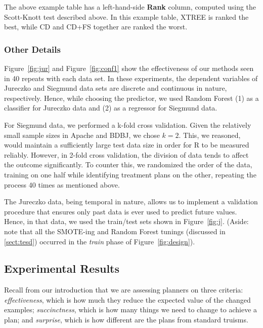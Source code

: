 \documentclass{sig-alternate}
\newcommand{\tion}[1]{\textsection\ref{sect:#1}}
\newcommand{\fig}[1]{Figure~\ref{fig:#1}}
\begin{document}
The above example table has a  left-hand-side  {\bf Rank} column, computed using the
Scott-Knott test described above. In this example table, XTREE is ranked the best, while CD and CD+FS together are ranked the worst.
  
   
 

 
\subsubsection{Other Details}
 
\fig{jur} and \fig{conf1} show the effectiveness of our methods seen in 40 repeats with each data set.
In these experiments,   the dependent variables of Jureczko and Siegmund data sets are discrete and continuous in nature, respectively. Hence, while choosing the predictor, we used Random Forest (1) as a classifier for Jureczko data and (2) as a regressor for Siegmund data.

For Siegmund data, we performed a k-fold cross validation. Given the relatively small sample sizes in Apache and BDBJ, we chose $k=2$. This, we reasoned, would maintain a sufficiently large test data size in order for R to be measured reliably. However, in 2-fold cross validation, the division of data tends to affect the outcome significantly. To counter this, we randomized the order of the data, training on one half while identifying treatment plans on the other, repeating the process 40 times as mentioned above.

The Jureczko data, being temporal in nature, allows us
to implement a validation procedure that ensures only past data is ever used to
predict future values. Hence, in that data, we used the train/test sets shown in \fig{j}. 
(Aside: note  that all the SMOTE-ing and Random Forest tunings (discussed in \tion{tesd}) occurred in the {\em train} phase of \fig{design}).

\subsection{Experimental Results}

Recall from our introduction that we are assessing planners on three criteria:
{\em effectiveness}, which is how much they reduce the expected value of the changed examples;
{\em succinctness}, which is how many things we need to change to achieve a plan;
and {\em surprise}, which is how different are the plans from standard truisms.



\end{document}
